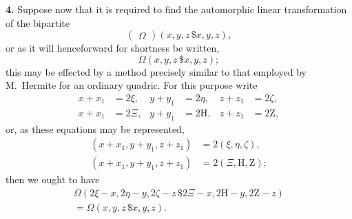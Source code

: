 \documentclass[12pt,a4paper]{article}
\theoremstyle{definition}
\begin{document}
\newpage

\medskip
\noindent\textbf{4.} Suppose now that it is required to find the automorphic linear transformation of the bipartite
\[
\begin{pmatrix} \Omega \end{pmatrix}(x,y,z\,\$x,y,z),
\]
or as it will henceforward for shortness be written,
\[\Omega(x,y,z\,\$x,y,z);\]
this may be effected by a method precisely similar to that employed by M.~Hermite for an ordinary quadric. For this purpose write
\begin{align*}
x+x_1 &= 2\xi, & y+y_1 &= 2\eta, & z+z_1 &= 2\zeta, \\
x+x_1 &= 2\Xi, & y+y_1 &= 2\mathrm{H}, & z+z_1 &= 2\mathrm{Z},
\end{align*}
or, as these equations may be represented,
\begin{align*}
(x+x_1, y+y_1, z+z_1) &= 2(\xi, \eta, \zeta), \\
(x+x_1, y+y_1, z+z_1) &= 2(\Xi, \mathrm{H}, \mathrm{Z});
\end{align*}
then we ought to have
\begin{multline*}
\Omega(2\xi-x, 2\eta-y, 2\zeta-z\,\$2\Xi-x, 2\mathrm{H}-y, 2\mathrm{Z}-z) \\
= \Omega(x,y,z\,\$x,y,z).
\end{multline*}
\end{document}
